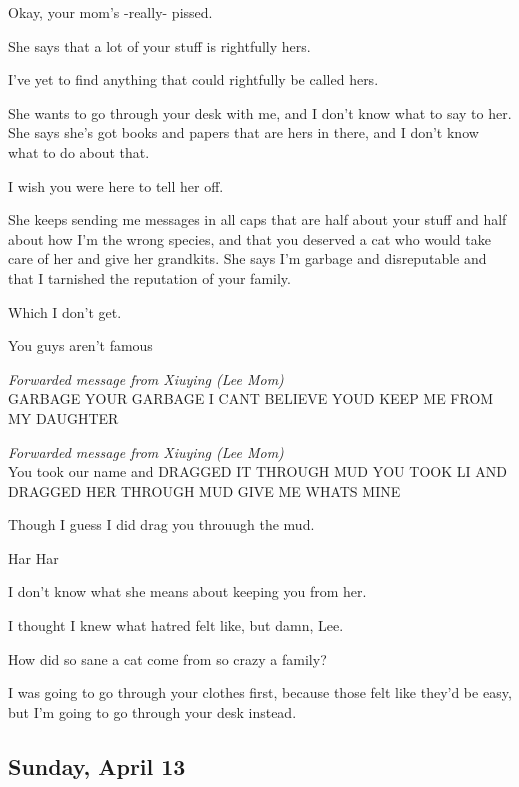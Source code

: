 { Okay, your mom's -really- pissed.

 She says that a lot of your stuff is rightfully hers.

 I've yet to find anything that could rightfully be called hers.

 She wants to go through your desk with me, and I don't know what to say to her. She says she's got books and papers that are hers in there, and I don't know what to do about that.

 I wish you were here to tell her off.

 She keeps sending me messages in all caps that are half about your stuff and half about how I'm the wrong species, and that you deserved a cat who would take care of her and give her grandkits. She says I'm garbage and disreputable and that I tarnished the reputation of your family.

 Which I don't get.

 You guys aren't famous

\emph{Forwarded message from Xiuying
(Lee Mom)}\\ GARBAGE YOUR GARBAGE I CANT BELIEVE YOUD KEEP ME FROM MY DAUGHTER

\emph{Forwarded message from Xiuying
(Lee Mom)}\\ You took our name and DRAGGED IT THROUGH MUD YOU TOOK LI AND DRAGGED HER THROUGH MUD GIVE ME WHATS MINE

 Though I guess I did drag you throuugh the mud.

 Har Har

 I don't know what she means about keeping you from her.

 I thought I knew what hatred felt like, but damn, Lee.

 How did so sane a cat come from so crazy a family?

 I was going to go through your clothes first, because those felt like they'd be easy, but I'm going to go through your desk instead.

\newpage

\subsection*{Sunday, April 13}\label{sunday-april-13}

}
